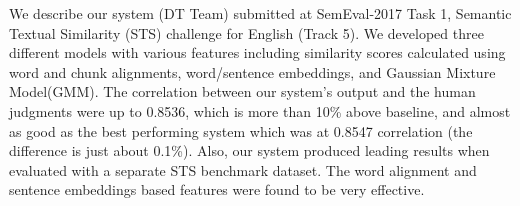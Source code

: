 We describe our system (DT Team) submitted at SemEval-2017 Task 1, Semantic Textual Similarity (STS) challenge for English (Track 5). We developed three different models with various features including similarity scores calculated using word and chunk alignments, word/sentence embeddings, and Gaussian Mixture Model(GMM). The correlation between our system's output and the human judgments were up to 0.8536, which is more than 10\% above baseline, and almost as good as the best performing system which was at 0.8547 correlation (the difference is just about 0.1\%). Also, our system produced leading results when evaluated with a separate STS benchmark dataset. The word alignment and sentence embeddings based features were found to be very effective.
